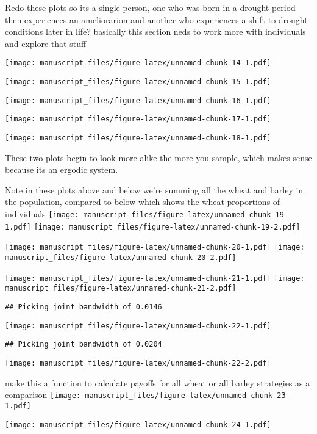 \documentclass[smallextended]{svjour3}       %
\begin{document}
Redo these plots so its a single person, one who was born in a drought
period then experiences an ameliorarion and another who experiences a
shift to drought conditions later in life? basically this section neds
to work more with individuals and explore that stuff

\texttt{[image: manuscript\_files/figure-latex/unnamed-chunk-14-1.pdf]}

\texttt{[image: manuscript\_files/figure-latex/unnamed-chunk-15-1.pdf]}

\texttt{[image: manuscript\_files/figure-latex/unnamed-chunk-16-1.pdf]}

\texttt{[image: manuscript\_files/figure-latex/unnamed-chunk-17-1.pdf]}

\texttt{[image: manuscript\_files/figure-latex/unnamed-chunk-18-1.pdf]}

These two plots begin to look more alike the more you sample, which
makes sense because its an ergodic system.

Note in these plots above and below we're summing all the wheat and
barley in the population, compared to below which shows the wheat
proportions of individuals
\texttt{[image: manuscript\_files/figure-latex/unnamed-chunk-19-1.pdf]}
\texttt{[image: manuscript\_files/figure-latex/unnamed-chunk-19-2.pdf]}

\texttt{[image: manuscript\_files/figure-latex/unnamed-chunk-20-1.pdf]}
\texttt{[image: manuscript\_files/figure-latex/unnamed-chunk-20-2.pdf]}

\texttt{[image: manuscript\_files/figure-latex/unnamed-chunk-21-1.pdf]}
\texttt{[image: manuscript\_files/figure-latex/unnamed-chunk-21-2.pdf]}

\begin{verbatim}
## Picking joint bandwidth of 0.0146
\end{verbatim}

\texttt{[image: manuscript\_files/figure-latex/unnamed-chunk-22-1.pdf]}

\begin{verbatim}
## Picking joint bandwidth of 0.0204
\end{verbatim}

\texttt{[image: manuscript\_files/figure-latex/unnamed-chunk-22-2.pdf]}

make this a function to calculate payoffs for all wheat or all barley
strategies as a comparison
\texttt{[image: manuscript\_files/figure-latex/unnamed-chunk-23-1.pdf]}

\texttt{[image: manuscript\_files/figure-latex/unnamed-chunk-24-1.pdf]}
\end{document}
